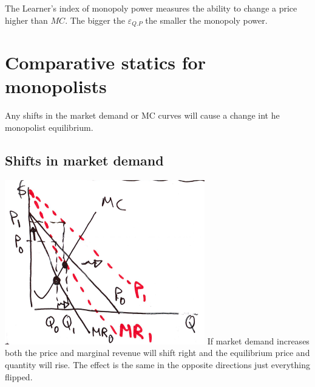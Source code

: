 \documentclass[../ECON-281-Notes.tex]{subfiles}
\begin{document}
The Learner's index of monopoly power measures the ability to change a price higher than $MC$.
The bigger the $\varepsilon_{Q.P}$ the smaller the monopoly power.

\newpage
\section{Comparative statics for monopolists}
Any shifts in the market demand or MC curves will cause a change int he monopolist equilibrium.

\subsection{Shifts in market demand}
\includegraphics[width=\columnwidth]{assets/image_2021-11-29-22-52-41.png}
If market demand increases both the price and marginal revenue will shift right and the equilibrium price and quantity will rise.
The effect is the same in the opposite directions just everything flipped.
\end{document}
